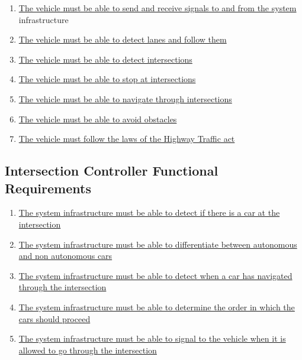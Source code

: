 \documentclass [11pt]{article}
\begin{document}
\begin{enumerate}[label=\textbf{V\arabic*:}, ref =V\arabic*, leftmargin=0.7in]

	
	\item \label{V1}  \hyperref[sec:changeL]{The vehicle must be able to send and receive signals to and from the system} infrastructure %
	
	\item \label{V2} \hyperref[sec:changeL]{The vehicle must be able to detect lanes and follow them} %
    
    \item \label{V3} \hyperref[sec:changeL]{The vehicle must be able to detect intersections}  %
    
    \item \label{V4} \hyperref[sec:changeL]{The vehicle must be able to stop at intersections} %
    
    \item \label{V5} \hyperref[sec:changeL]{The vehicle must be able to navigate through intersections} %
    
    \item \label{V6} \hyperref[sec:changeL]{The vehicle must be able to avoid obstacles} %
    
    \item \label{V7} \hyperref[sec:changeL]{The vehicle must follow the laws of the Highway Traffic act} %
\end{enumerate}






\subsection{Intersection Controller Functional Requirements}
\begin{enumerate}[label=\textbf{IC\arabic*:}, ref =IC\arabic*, leftmargin=0.8in]

	\item \label{IC1} \hyperref[sec:changeL]{The system infrastructure must be able to detect if there is a car at the intersection } %

	
	\item \label{IC2}\hyperref[sec:changeL]{The system infrastructure must be able to differentiate between autonomous and non autonomous cars} %
	
	\item \label{IC3}\hyperref[sec:changeL]{The system infrastructure must be able to detect when a car has navigated through the intersection} %

    \item \label{IC4}\hyperref[sec:changeL]{The system infrastructure must be able to determine the order in which the cars should proceed} %
    
    \item \label{IC5} \hyperref[sec:changeL]{The system infrastructure must be able to signal to the vehicle when it is allowed to go through the intersection} %
\end{enumerate}
\end{document}
